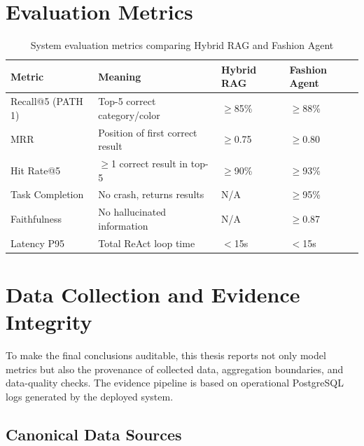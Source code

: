 \section{Evaluation Metrics}

\begin{table}[H]
\centering
\begin{tabular}{llll}
\toprule
\textbf{Metric} & \textbf{Meaning} & \textbf{Hybrid RAG} & \textbf{Fashion Agent}\\
\midrule
Recall@5 (PATH 1)   & Top-5 correct category/color   & $\geq$85\% & $\geq$88\%\\
MRR                 & Position of first correct result & $\geq$0.75 & $\geq$0.80\\
Hit Rate@5          & $\geq$1 correct result in top-5 & $\geq$90\% & $\geq$93\%\\
Task Completion     & No crash, returns results       & N/A         & $\geq$95\%\\
Faithfulness        & No hallucinated information     & N/A         & $\geq$0.87\\
Latency P95         & Total ReAct loop time           & $<$15s      & $<$15s\\
\bottomrule
\end{tabular}
\caption{System evaluation metrics comparing Hybrid RAG and Fashion Agent}
\end{table}

\section{Data Collection and Evidence Integrity}
\label{sec:data_evidence_integrity}

To make the final conclusions auditable, this thesis reports not only model metrics but also the provenance of collected data, aggregation boundaries, and data-quality checks. The evidence pipeline is based on operational PostgreSQL logs generated by the deployed system.

\subsection{Canonical Data Sources}
\label{subsec:canonical_data_sources}

